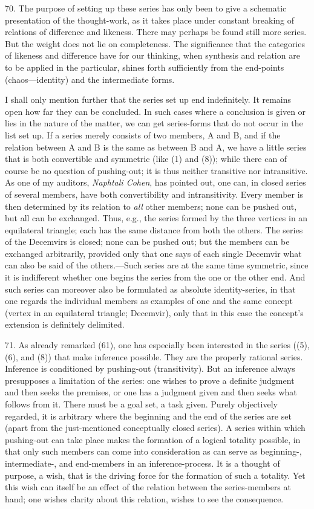 \documentclass[12pt,a4paper]{book}
\newcommand{\opage}[1]{\marginnote{\footnotesize\textit{[#1]}}}
\begin{document}
70. The purpose of setting up these series has only been to give a schematic
presentation of the thought-work, as it takes place under constant breaking
of relations of difference and likeness. There may perhaps be found still
more series. But the weight does not lie on completeness. The significance
that the categories of likeness and difference have for our thinking, when
synthesis and relation are to be applied in the particular, shines forth
sufficiently from the end-points (chaos---identity) and the intermediate
forms.

I shall only mention further that the series set up end indefinitely. It
remains open how far they can be concluded. In such cases where a conclusion
is given or lies in the nature of the matter, we can get series-forms that do
not occur in the list set up. If a series merely consists of two members, A
and B, and if the relation between A and B is the same as between B and A, we
have a little series that is both convertible and symmetric (like (1) and
(8)); while there can of course be no question of pushing-out; it is thus
neither transitive nor intransitive. As one of my auditors, \emph{Naphtali
Cohen}, has pointed out, one can, in closed series of several members, have
both convertibility and intransitivity. Every member is then determined by
its relation to \emph{all} other members; none can be pushed out, but all can
be exchanged. Thus, e.g., the series \opage{173}formed by the three vertices in an
equilateral triangle; each has the same distance from both the others. The
series of the Decemvirs is closed; none can be pushed out; but the members
can be exchanged arbitrarily, provided only that one says of each single
Decemvir what can also be said of the others.---Such series are at the same
time symmetric, since it is indifferent whether one begins the series from
the one or the other end. And such series can moreover also be formulated as
absolute identity-series, in that one regards the individual members as
examples of one and the same concept (vertex in an equilateral triangle;
Decemvir), only that in this case the concept's extension is definitely
delimited.

71. As already remarked (61), one has especially been interested in the
series ((5), (6), and (8)) that make inference possible. They are the
properly rational series. Inference is conditioned by pushing-out
(transitivity). But an inference always presupposes a limitation of the
series: one wishes to prove a definite judgment and then seeks the premises,
or one has a judgment given and then seeks what follows from it. There must
be a goal set, a task given. Purely objectively regarded, it is arbitrary
where the beginning and the end of the series are set (apart from the
just-mentioned conceptually closed series). A series within which
pushing-out can take place makes the formation of a logical totality
possible, in that only such members can come into consideration as
can serve as beginning-, intermediate-, and end-members in an
inference-process. It is a thought of purpose, a wish, that is the driving
force for the formation of such a totality. Yet this wish can itself be an
effect of the relation between the series-members at hand; one wishes
clarity about this relation, wishes to see the consequence.
\end{document}
